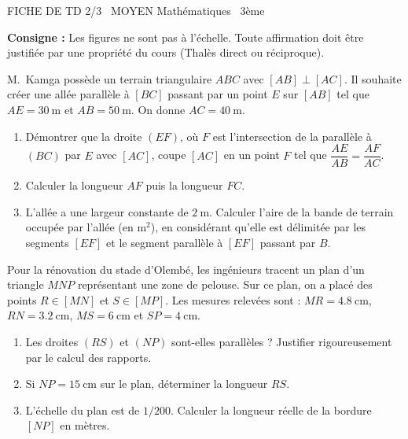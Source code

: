 \documentclass[11pt]{article}
\begin{document}
\begin{tcolorbox}[enhanced,colback=popink,colframe=popink,arc=10pt,boxrule=0pt,left=12pt,right=12pt,top=9pt,bottom=9pt]
{\color{white}\popxbold\small FICHE DE TD 2/3 \textbullet\ MOYEN \hfill Mathématiques \textbullet\ 3ème\par}
\end{tcolorbox}
\vspace{4pt}
\noindent\textbf{Consigne :} Les figures ne sont pas à l'échelle. Toute affirmation doit être justifiée par une propriété du cours (Thalès direct ou réciproque).\\

\begin{exercice}
M.~Kamga possède un terrain triangulaire $ABC$ avec $[AB] \perp [AC]$. Il souhaite créer une allée parallèle à $[BC]$ passant par un point $E$ sur $[AB]$ tel que $AE = \SI{30}{\meter}$ et $AB = \SI{50}{\meter}$. On donne $AC = \SI{40}{\meter}$.
\begin{enumerate}
    \item Démontrer que la droite $(EF)$, où $F$ est l'intersection de la parallèle à $(BC)$ par $E$ avec $[AC]$, coupe $[AC]$ en un point $F$ tel que $\dfrac{AE}{AB} = \dfrac{AF}{AC}$.
    \item Calculer la longueur $AF$ puis la longueur $FC$.
    \item L'allée a une largeur constante de $\SI{2}{\meter}$. Calculer l'aire de la bande de terrain occupée par l'allée (en $\si{\meter\squared}$), en considérant qu'elle est délimitée par les segments $[EF]$ et le segment parallèle à $[EF]$ passant par $B$.
\end{enumerate}
\end{exercice}

\begin{exercice}
Pour la rénovation du stade d'Olembé, les ingénieurs tracent un plan d'un triangle $MNP$ représentant une zone de pelouse. Sur ce plan, on a placé des points $R \in [MN]$ et $S \in [MP]$. Les mesures relevées sont : $MR = \SI{4,8}{\centi\meter}$, $RN = \SI{3,2}{\centi\meter}$, $MS = \SI{6}{\centi\meter}$ et $SP = \SI{4}{\centi\meter}$.
\begin{enumerate}
    \item Les droites $(RS)$ et $(NP)$ sont-elles parallèles ? Justifier rigoureusement par le calcul des rapports.
    \item Si $NP = \SI{15}{\centi\meter}$ sur le plan, déterminer la longueur $RS$.
    \item L'échelle du plan est de $1/200$. Calculer la longueur réelle de la bordure $[NP]$ en mètres.
\end{enumerate}
\end{exercice}
\end{document}
